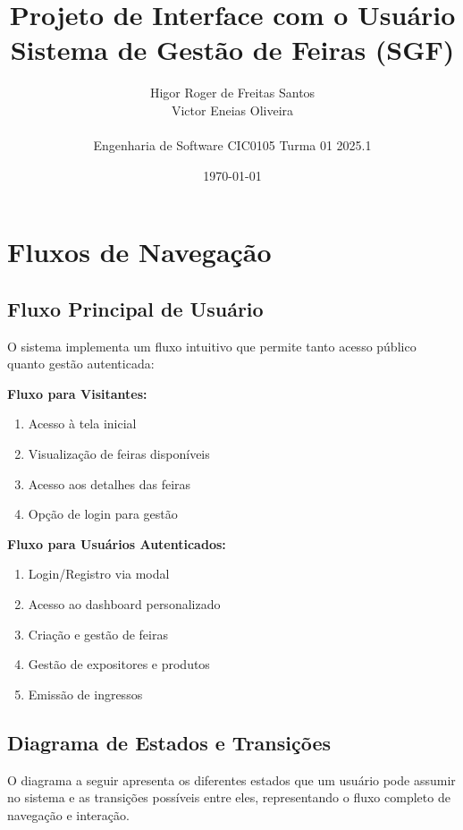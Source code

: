 \documentclass[12pt,a4paper]{article}
\title{\textbf{Projeto de Interface com o Usuário}\\
\large Sistema de Gestão de Feiras (SGF)}
\author{Higor Roger de Freitas Santos \quad 221006440\\
Victor Eneias Oliveira \quad 221038364\\
\\
Engenharia de Software CIC0105 Turma 01 2025.1}
\date{\today}
\begin{document}
\maketitle
\tableofcontents
\newpage

\section{Fluxos de Navegação}

\subsection{Fluxo Principal de Usuário}

O sistema implementa um fluxo intuitivo que permite tanto acesso público quanto gestão autenticada:

\textbf{Fluxo para Visitantes:}
\begin{enumerate}
    \item Acesso à tela inicial
    \item Visualização de feiras disponíveis
    \item Acesso aos detalhes das feiras
    \item Opção de login para gestão
\end{enumerate}

\textbf{Fluxo para Usuários Autenticados:}
\begin{enumerate}
    \item Login/Registro via modal
    \item Acesso ao dashboard personalizado
    \item Criação e gestão de feiras
    \item Gestão de expositores e produtos
    \item Emissão de ingressos
\end{enumerate}

\subsection{Diagrama de Estados e Transições}

O diagrama a seguir apresenta os diferentes estados que um usuário pode assumir no sistema e as transições possíveis entre eles, representando o fluxo completo de navegação e interação.
\end{document}
